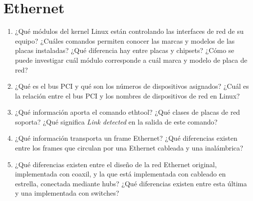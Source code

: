 


\section{Ethernet}
\begin{enumerate}
\item ¿Qué módulos del kernel Linux están controlando las interfaces de red de su equipo? ¿Cuáles comandos permiten conocer las marcas y modelos de las placas instaladas? ¿Qué diferencia hay entre placas y chipsets? ¿Cómo se puede investigar cuál módulo corresponde a cuál marca y modelo de placa de red? 
\item ¿Qué es el bus PCI y qué son los números de dispositivos asignados? ¿Cuál es la relación entre el bus PCI y los nombres de dispositivos de red en Linux?
\item ¿Qué información aporta el comando ethtool? ¿Qué clases de placas de red soporta? ¿Qué significa \emph{Link detected} en la salida de este comando?
\item ¿Qué información transporta un frame Ethernet? ¿Qué diferencias existen entre los frames que circulan por una Ethernet cableada y una inalámbrica? 
\item ¿Qué diferencias existen entre el diseño de la red Ethernet original, implementada con coaxil, y la que está implementada con cableado en estrella, conectada mediante hubs? ¿Qué diferencias existen entre esta última y una implementada con switches? 
\end{enumerate}


